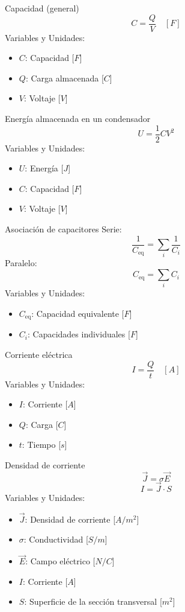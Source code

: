 \begin{landscape}
\begin{multicols}{3}
\begin{teorema}{Capacidad (general)}
    $$C = \frac{Q}{V} \quad [F]$$
    Variables y Unidades:
    \begin{itemize}
        \item $C$: Capacidad [$F$]
        \item $Q$: Carga almacenada [$C$]
        \item $V$: Voltaje [$V$]
    \end{itemize}
\end{teorema}

\begin{teorema}{Energía almacenada en un condensador}
    $$U = \frac{1}{2} C V^2$$
    Variables y Unidades:
    \begin{itemize}
        \item $U$: Energía [$J$]
        \item $C$: Capacidad [$F$]
        \item $V$: Voltaje [$V$]
    \end{itemize}
\end{teorema}

\begin{teorema}{Asociación de capacitores}
    Serie: $$\frac{1}{C_{\text{eq}}} = \sum_i \frac{1}{C_i}$$
    Paralelo: $$C_{\text{eq}} = \sum_i C_i$$
    Variables y Unidades:
    \begin{itemize}
        \item $C_{\text{eq}}$: Capacidad equivalente [$F$]
        \item $C_i$: Capacidades individuales [$F$]
    \end{itemize}
\end{teorema}

\columnbreak

\begin{teorema}{Corriente eléctrica}
    $$ I = \frac{Q}{t} \quad [A]$$
    Variables y Unidades:
    \begin{itemize}
        \item $I$: Corriente [$A$]
        \item $Q$: Carga [$C$]
        \item $t$: Tiempo [$s$]
    \end{itemize}
\end{teorema}

\begin{teorema}{Densidad de corriente}
    $$\vec{J} = \sigma \vec{E}$$
    $$I = \vec{J} \cdot S$$
    Variables y Unidades:
    \begin{itemize}
        \item $\vec{J}$: Densidad de corriente [$A/m^2$]
        \item $\sigma$: Conductividad [$S/m$]
        \item $\vec{E}$: Campo eléctrico [$N/C$]
        \item $I$: Corriente [$A$]
        \item $S$: Superficie de la sección transversal [$m^2$]
    \end{itemize}
\end{teorema}


\end{multicols}
\end{landscape}
